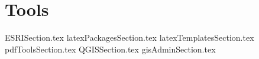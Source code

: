 \documentclass[class=report , crop=false, openany, titlepage, twoside, multi={itemize, figure, verbatim}, float=false]{standalone}
\title{}  %
\begin{document}
\ifstandalone
\maketitle %
\clearpage
\tableofcontents %
\clearpage
\fi

\chapter{Tools}
{ESRISection.tex}
\clearpage
{latexPackagesSection.tex}
\clearpage
{latexTemplatesSection.tex}
\clearpage
{pdfToolsSection.tex}
\clearpage
{QGISSection.tex}
\clearpage
{gisAdminSection.tex}
\end{document}
